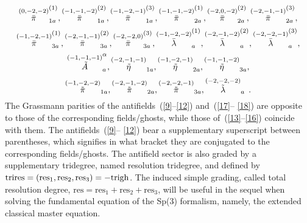 \documentclass[a4paper,10pt]{article}
\begin{document}
\begin{equation}
\label{15}
\stackrel{(0,-2,-2)}{\bar{\pi}}_{1a}^{(1)},\stackrel{(-1,-1,-2)}{\bar{\pi}}%
_{1a}^{(2)},\stackrel{(-1,-2,-1)}{\bar{\pi}}_{1a}^{(3)},\stackrel{(-1,-1,-2)%
}{\bar{\pi}}_{2a}^{(1)},\stackrel{(-2,0,-2)}{\bar{\pi}}_{2a}^{(2)},\stackrel{%
(-2,-1,-1)}{\bar{\pi}}_{2a}^{(3)},
\end{equation}
\begin{equation}
\label{16}
\stackrel{(-1,-2,-1)}{\bar{\pi}}_{3a}^{(1)},\stackrel{(-2,-1,-1)}{\bar{\pi}}%
_{3a}^{(2)},\stackrel{(-2,-2,0)}{\bar{\pi}}_{3a}^{(3)},\stackrel{(-1,-2,-2)}{%
\bar{\lambda}}_{a}^{(1)},\stackrel{(-2,-1,-2)}{\bar{\lambda}}_{a}^{(2)},%
\stackrel{(-2,-2,-1)}{\bar{\lambda}}_{a}^{(3)},
\end{equation}
\begin{equation}
\label{17}
\stackrel{(-1,-1,-1)}{\tilde{A}}_{a}^{\alpha },\stackrel{(-2,-1,-1)}{\tilde{%
\eta}}_{1a},\stackrel{(-1,-2,-1)}{\tilde{\eta}}_{2a},\stackrel{(-1,-1,-2)}{%
\tilde{\eta}}_{3a},
\end{equation}
\begin{equation}
\label{18}
\stackrel{(-1,-2,-2)}{\tilde{\pi}}_{1a},\stackrel{(-2,-1,-2)}{\tilde{\pi}}%
_{2a},\stackrel{(-2,-2,-1)}{\tilde{\pi}}_{3a},\stackrel{(-2,-2,-2)}{\tilde{%
\lambda}}_{a}\,.
\end{equation}
The Grassmann parities of the antifields~(\ref{9}--\ref{12}) and~(\ref{17}--%
\ref{18}) are opposite to those of the corresponding fields/ghosts, while
those of~(\ref{13}--\ref{16}) coincide with them. The antifields~(\ref{9}--%
\ref{12}) bear a supplementary superscript between parentheses, which
signifies in what bracket they are conjugated to the corresponding
fields/ghosts. The antifield
sector is also graded by a supplementary tridegree, named resolution
tridegree, and defined by $\mathrm{trires}=\left( \mathrm{res}_{1},\mathrm{%
res}_{2},\mathrm{res}_{3}\right) =-\mathrm{trigh}$. The induced simple
grading, called total resolution degree, $\mathrm{res}=\mathrm{res}_{1}+%
\mathrm{res}_{2}+\mathrm{res}_{3}$, will be useful in the sequel when
solving the fundamental equation of the Sp(3) formalism, namely, the
extended classical master equation.
\end{document}
